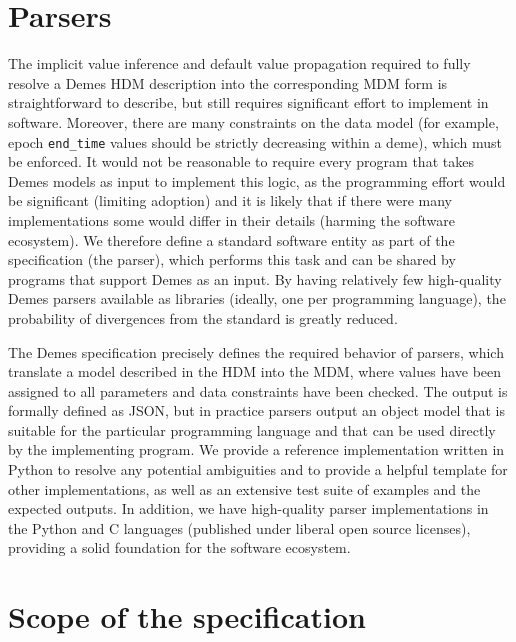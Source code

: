 \documentclass[11pt]{article}
\begin{document}
\section{Parsers}\label{sec:appendix-parsers}

The implicit value inference and default value propagation required to
fully resolve a Demes HDM description into the corresponding
MDM form is straightforward
to describe, but still requires significant effort to implement in
software. Moreover, there are many constraints on the data model
(for example, epoch \texttt{end\_time} values should be strictly decreasing
within a deme), which must be enforced.
It would not be reasonable to require every program that
takes Demes models as input to implement this logic, as the programming
effort would be significant (limiting adoption)
and it is likely that if there were many implementations some would differ
in their details (harming the software ecosystem).
We therefore define
a standard software entity as part of the specification (the parser),
which performs this task and can be shared by programs that
support Demes as an input. By having relatively few high-quality Demes
parsers available as libraries (ideally, one per programming language),
the probability of divergences from the standard is greatly reduced.

The Demes specification precisely defines the required behavior of parsers,
which translate a model described in the HDM into the MDM, where values have been
assigned to all parameters and data
constraints have been checked. The output is formally defined as JSON, but in
practice parsers output an object model that is suitable for the particular
programming language and that can be used directly by the implementing program.
We provide a reference implementation written in Python to resolve any
potential ambiguities and to provide a helpful template for other
implementations, as well as an extensive test suite of examples and the
expected outputs. In addition, we have high-quality parser implementations in
the Python and C languages (published under liberal open source licenses),
providing a solid foundation for the software ecosystem.

\section{Scope of the specification}
\label{sec:appendix-scope}
\end{document}
